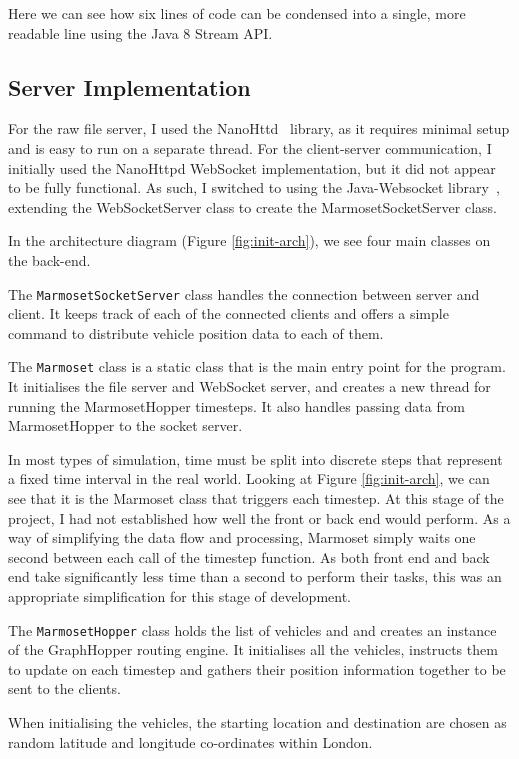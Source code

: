 \documentclass[ %
                    author={Alexander Hill},
                supervisor={Dr. Benjamin Sach},
                    degree={MEng},
                     title={MARMOSET},
                  subtitle={Multi-Agent Route Management using Online Simulation for Efficient Transportation},
                      type={research},
                      year={2016} ]{dissertation}
\begin{document}
Here we can see how six lines of code can be condensed into a single, more
readable line using the Java 8 Stream API.

\subsection{Server Implementation}

For the raw file server, I used the NanoHttd~\cite{nanohttpd} library, as it
requires minimal setup and is easy to run on a separate thread. For the
client-server communication, I initially used the NanoHttpd WebSocket
implementation, but it did not appear to be fully functional. As such, I
switched to using the Java-Websocket library~\cite{javawebsocket}, extending the
WebSocketServer class to create the MarmosetSocketServer class.

In the architecture diagram (Figure \ref{fig:init-arch}), we see four main
classes on the back-end.

The \texttt{MarmosetSocketServer} class handles the connection between server
and client.  It keeps track of each of the connected clients and offers a simple
command to distribute vehicle position data to each of them.

The \texttt{Marmoset} class is a static class that is the main entry point for
the program. It initialises the file server and WebSocket server, and creates a
new thread for running the MarmosetHopper timesteps. It also handles passing
data from MarmosetHopper to the socket server.

In most types of simulation, time must be split into discrete steps that
represent a fixed time interval in the real world. Looking at Figure
\ref{fig:init-arch}, we can see that it is the Marmoset class that triggers each
timestep. At this stage of the project, I had not established how well the front
or back end would perform. As a way of simplifying the data flow and processing,
Marmoset simply waits one second between each call of the timestep function.  As
both front end and back end take significantly less time than a second to
perform their tasks, this was an appropriate simplification for this stage of
development.

The \texttt{MarmosetHopper} class holds the list of vehicles and and creates an
instance of the GraphHopper routing engine. It initialises all the vehicles,
instructs them to update on each timestep and gathers their position information
together to be sent to the clients.

When initialising the vehicles, the starting location and destination are chosen
as random latitude and longitude co-ordinates within London.
\end{document}

